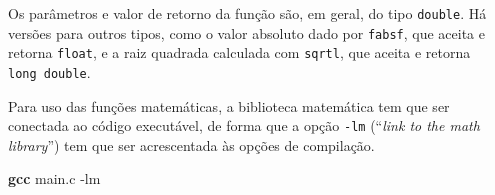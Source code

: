 \documentclass[
  11pt,
  a4paper,
]{scrbook}
\newenvironment{Shaded}{\begin{snugshade}}{\end{snugshade}}
\newcommand{\AttributeTok}[1]{\textcolor[rgb]{0.13,0.29,0.53}{#1}}
\newcommand{\FunctionTok}[1]{\textcolor[rgb]{0.13,0.29,0.53}{\textbf{#1}}}
\newcommand{\NormalTok}[1]{#1}
\begin{document}
Os parâmetros e valor de retorno da função são, em geral, do tipo
\texttt{double}. Há versões para outros tipos, como o valor absoluto
dado por \texttt{fabsf}, que aceita e retorna \texttt{float}, e a raiz
quadrada calculada com \texttt{sqrtl}, que aceita e retorna
\texttt{long\ double}.

Para uso das funções matemáticas, a biblioteca matemática tem que ser
conectada ao código executável, de forma que a opção \texttt{-lm}
(``\emph{link to the math library}'') tem que ser acrescentada às opções
de compilação.

\begin{Shaded}
\begin{Highlighting}[]
\FunctionTok{gcc}\NormalTok{ main.c }\AttributeTok{{-}lm}
\end{Highlighting}
\end{Shaded}
\end{document}
